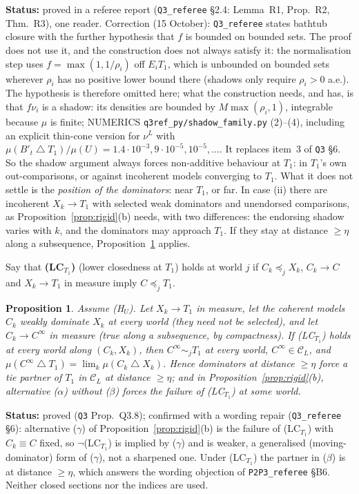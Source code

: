 \documentclass[11pt]{article}
\newtheorem{proposition}[theorem]{Proposition}
\theoremstyle{definition}
\theoremstyle{remark}
\newcommand{\C}{\mathcal C}
\newcommand{\sd}{\mathbin{\triangle}}
\newcommand{\src}[1]{\texttt{#1}}
\newcommand{\status}[1]{\par\smallskip\noindent\textbf{Status:} #1\par\smallskip}
\begin{document}
\status{proved in a referee report (\src{Q3\_referee} \S2.4: Lemma~R1, Prop.~R2, Thm.~R3), one reader. Correction (15 October): \src{Q3\_referee} states bathtub closure with the further hypothesis that $f$ is bounded on bounded sets. The proof does not use it, and the construction does not always satisfy it: the normalisation step uses $f=\max(1,1/\rho_i)$ off $E_iT_1$, which is unbounded on bounded sets wherever $\rho_i$ has no positive lower bound there (shadows only require $\rho_i>0$ a.e.). The hypothesis is therefore omitted here; what the construction needs, and has, is that $f\nu_i$ is a shadow: its densities are bounded by $M\max(\rho_i,1)$, integrable because $\mu$ is finite; NUMERICS \src{q3ref\_py/shadow\_family.py} (2)--(4), including an explicit thin-cone version for $\nu^L$ with $\mu(B'_t\sd T_1)/\mu(U)=1.4\cdot10^{-3},9\cdot10^{-5},10^{-5},\dots$. It replaces item~3 of \src{Q3} \S6. So the shadow argument always forces non-additive behaviour at $T_1$: in $T_1$'s own out-comparisons, or against incoherent models converging to $T_1$. What it does not settle is the \emph{position of the dominators}: near $T_1$, or far. In case (ii) there are incoherent $X_k\to T_1$ with selected weak dominators and unendorsed comparisons, as Proposition~\ref{prop:rigid}(b) needs, with two differences: the endorsing shadow varies with $k$, and the dominators may approach $T_1$. If they stay at distance $\ge\eta$ along a subsequence, Proposition~\ref{prop:Q38} applies.}

Say that \textbf{(LC$_{T_1}$)} (lower closedness at $T_1$) holds at world $j$ if $C_k\preceq_jX_k$, $C_k\to C$ and $X_k\to T_1$ in measure imply $C\preceq_jT_1$.

\begin{proposition}\label{prop:Q38}
Assume (H$_U$). Let $X_k\to T_1$ in measure, let the coherent models $C_k$ weakly dominate $X_k$ at every world (they need not be selected), and let $C_k\to C^\infty$ in measure (true along a subsequence, by compactness). If (LC$_{T_1}$) holds at every world along $(C_k,X_k)$, then $C^\infty\sim_jT_1$ at every world, $C^\infty\in\C_L$, and $\mu(C^\infty\sd T_1)=\lim_k\mu(C_k\sd X_k)$. Hence dominators at distance $\ge\eta$ force a tie partner of $T_1$ in $\C_L$ at distance $\ge\eta$; and in Proposition~\ref{prop:rigid}(b), alternative ($\alpha$) without ($\beta$) forces the failure of (LC$_{T_1}$) at some world.
\end{proposition}
\status{proved (\src{Q3} Prop.~Q3.8); confirmed with a wording repair (\src{Q3\_referee} \S6): alternative ($\gamma$) of Proposition~\ref{prop:rigid}(b) is the failure of (LC$_{T_1}$) with $C_k\equiv C$ fixed, so $\neg$(LC$_{T_1}$) is implied by ($\gamma$) and is weaker, a generalised (moving-dominator) form of ($\gamma$), not a sharpened one. Under (LC$_{T_1}$) the partner in ($\beta$) is at distance $\ge\eta$, which answers the wording objection of \src{P2P3\_referee} \S B6. Neither closed sections nor the indices are used.}
\end{document}
